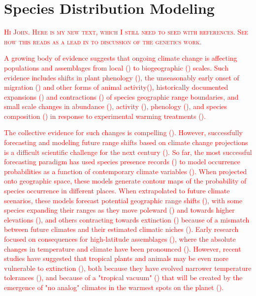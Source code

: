\documentclass{article}
\newcommand{\Ntxt}[1]{\textcolor{red}{#1}}
\newcommand{\Ncom}[1]{\textsc {\textcolor{red}{#1}}}
\begin{document}
\section*{Species Distribution Modeling}
\Ncom{Hi John. Here is my new text, which I still need to seed with references. See how this reads as a lead in to discussion of the genetics work.}

\Ntxt{A growing body of evidence suggests that ongoing climate change is affecting populations and assemblages from local () to biogeographic () scales. Such evidence includes shifts in plant phenology (), the unseasonably early onset of migration () and other forms of animal activity(), historically documented expansions () and contractions () of species geographic range boundaries, and small scale changes in abundance (), activity (), phenology (), and species composition () in response to experimental warming treatments ().}

\Ntxt{The collective evidence for such changes is compelling (). However, successfully forecasting and modeling future range shifts based on  climate change projections is a difficult scientific challenge for the next century (). So far, the most successful forecasting paradigm has used species presence records () to model occurrence probabilities as a function of contemporary climate variables (). When projected onto geographic space, these models generate contour maps of the probability of species occurrence in different places. When extrapolated to future climate scenarios, these models forecast potential geographic range shifts (), with some species expanding their ranges as they move poleward () and towards higher elevations (), and others contracting towards extinction () because of a mismatch between future climates and their estimated climatic niches (). Early research focused on consequences for high-latitude assemblages (), where the absolute changes in temperature and climate have been pronounced (). However, recent studies have suggested  that tropical plants and animals may be even more vulnerable to extinction (),  both because they have evolved narrower temperature tolerances (), and because of a "tropical vacuum" () that will be created by the emergence of "no analog" climates in the warmest spots on the planet ().}
\end{document}
